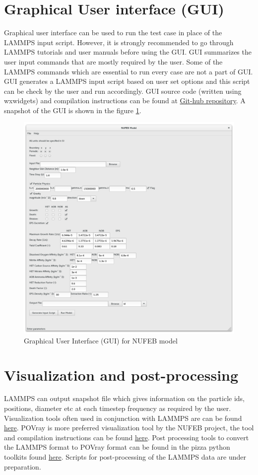 \documentclass[11pt,a4paper,openright]{article}
\begin{document}
\section{Graphical User interface (GUI)}
Graphical user interface can be used to run the test case in place of the LAMMPS input script. However, it is strongly recommended to go through LAMMPS tutorials and user manuals before using the GUI. GUI summarizes the user input commands that are mostly required by the user. Some of the LAMMPS commands which are essential to run every case are not a part of GUI. GUI generates a LAMMPS input script based on user set options and this script can be check by the user and run accordingly. GUI source code (written using wxwidgets) and compilation instructions can be found at \href{https://github.com/darrenjw/nufeb/tree/master/code/gui}{Git-hub repository}. A snapshot of the GUI is shown in the figure \ref{fig:GUI}. 

\begin{figure}[H]
\begin{center}
  \includegraphics[width=0.9\columnwidth]{Figs/GUI.pdf}
\caption{Graphical User Interface (GUI) for NUFEB model}
\label{fig:GUI}       %
\end{center}
\end{figure}


\section{Visualization and post-processing}
LAMMPS can output snapshot file which gives information on the particle ids, positions, diameter etc at each timestep frequency as required by the user. Visualization tools often used in conjunction with LAMMPS are can be found \href{ http://lammps.sandia.gov/viz.html}{here}. POVray is more preferred visualization tool by the NUFEB project, the tool and compilation instructions can be found \href{http://www.povray.org/}{here}. Post processing tools to convert the LAMMPS format to POVray format can be found in the pizza python toolkits found \href{http://pizza.sandia.gov/}{here}. Scripts for post-processing of the LAMMPS data are under preparation. 
\end{document}
